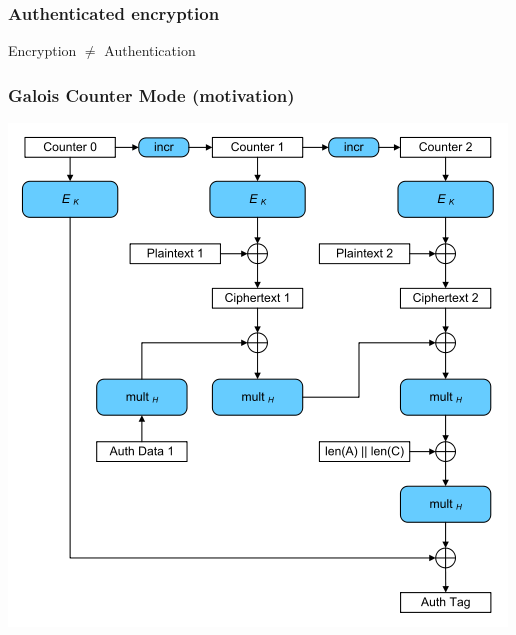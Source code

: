 \documentclass{beamer}
\begin{document}
\begin{frame}
\frametitle{Authenticated encryption}
\begin{center}
Encryption $\neq$ Authentication
\end{center}
\end{frame}

\begin{frame}
\frametitle{Galois Counter Mode (motivation)}
\begin{center}
\includegraphics[height=0.7\textheight]{mode-gcm.png}
\end{center}
\end{frame}
\end{document}
